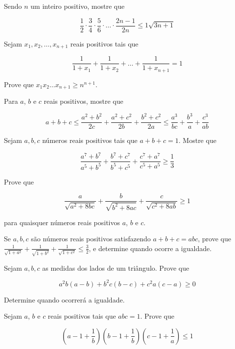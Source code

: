 \begin{questao}
  Sendo $n$ um inteiro positivo, mostre que

  $$ \frac{1}{2} \cdot \frac{3}{4} \cdot \frac{5}{6} \cdot \ldots \cdot
  \frac{2n-1}{2n} \leq {1}{\sqrt{3n+1}} $$
\end{questao}

\begin{questao}
  Sejam $x_1,x_2,\ldots,x_{n+1}$ reais positivos tais que

  $$ \frac{1}{1+x_1}+\frac{1}{1+x_2}+\ldots+\frac{1}{1+x_{n+1}} = 1 $$

  Prove que $x_1x_2\ldots x_{n+1} \geq n^{n+1}$.
\end{questao}

\begin{questao}
  Para $a$, $b$ e $c$ reais positivos, mostre que

  $$ a+b+c \leq \frac{a^2+b^2}{2c} +\frac{a^2+c^2}{2b} +\frac{b^2+c^2}{2a} \leq
  \frac{a^3}{bc} + \frac{b^3}{a} + \frac{c^3}{ab} $$
\end{questao}

\begin{questao}
  Sejam $a,b,c$ números reais positivos tais que $a+b+c=1$. Mostre que

  $$ \frac{a^7+b^7}{a^5+b^5} + \frac{b^7+c^7}{b^5+c^5} + \frac{c^7+a^7}{c^5+a^5}
  \geq \frac{1}{3} $$
\end{questao}

\begin{questao}
  Prove que

  $$ \frac{a}{\sqrt{a^2+8bc}} + \frac{b}{\sqrt{b^2+8ac}} +
  \frac{c}{\sqrt{c^2+8ab}} \geq 1 $$

  para quaisquer números reais positivos $a$, $b$ e $c$.
\end{questao}

\begin{questao}
  Se $a,b,c$ são números reais positivos satisfazendo $a+b+c=abc$, prove que
  $\frac{1}{\sqrt{1+a^2}} + \frac{1}{\sqrt{1+b^2}} + \frac{1}{\sqrt{1+c^2}} \leq
  \frac{3}{2}$, e determine quando ocorre a igualdade.
\end{questao}

\begin{questao}
  Sejam $a,b,c$ as medidas dos lados de um triângulo. Prove que

  $$ a^2b(a-b) + b^2c(b-c) + c^2a(c-a) \geq 0$$

  Determine quando ocorrerá a igualdade.
\end{questao}

\begin{questao}
  Sejam $a$, $b$ e $c$ reais positivos tais que $abc=1$. Prove que

  $$ \left( a-1+\frac{1}{b} \right) \left( b-1+\frac{1}{b} \right) \left(
  c-1+\frac{1}{a} \right) \leq 1$$
\end{questao}

